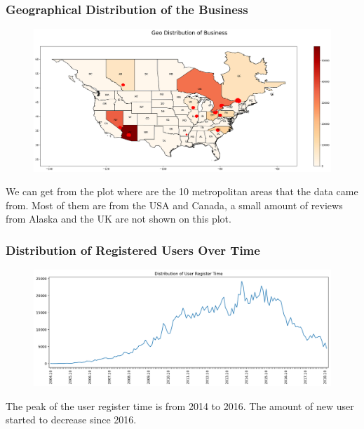 \documentclass[12pt]{article}
\begin{document}
\subsubsection{Geographical Distribution of the Business}
\begin{figure}[H]
\begin{center}
    \includegraphics[width=1.0\textwidth]{../05_dataMining/distributionBusinessGeo.png}
\end{center}
\end{figure}
We can get from the plot where are the 10 metropolitan areas that the data came from. Most of them are from the USA and Canada, a small amount of reviews from Alaska and the UK are not shown on this plot.

\subsubsection{Distribution of Registered Users Over Time}
\begin{figure}[H]
\begin{center}
    \includegraphics[width=1.0\textwidth]{../05_dataMining/distributionUserRegisterTime.png}
\end{center}
\end{figure}
The peak of the user register time is from 2014 to 2016. The amount of new user started to decrease since 2016. 
\end{document}
